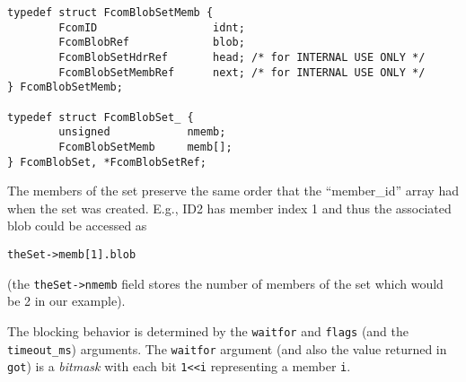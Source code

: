 \documentclass[11pt]{article}
\newcommand{\set}{set}
\newcommand{\cstl}[1]{{\lstinline+#1+}}
\begin{document}
      \begin{verbatim}
typedef struct FcomBlobSetMemb {
        FcomID                  idnt;
        FcomBlobRef             blob;
        FcomBlobSetHdrRef       head; /* for INTERNAL USE ONLY */
        FcomBlobSetMembRef      next; /* for INTERNAL USE ONLY */
} FcomBlobSetMemb;
 
typedef struct FcomBlobSet_ {
        unsigned            nmemb;
        FcomBlobSetMemb     memb[];
} FcomBlobSet, *FcomBlobSetRef;
      \end{verbatim}

      The members of the \set{} preserve the same order that the ``member\_id'' array
      had when the \set{} was created. E.g., ID2 has member index 1 and thus the
      associated blob could be accessed as
      \begin{verbatim}
theSet->memb[1].blob
      \end{verbatim}
      (the \cstl{theSet->nmemb} field stores the number of members of the set which would
      be 2 in our example).

      The blocking behavior is determined by the \cstl{waitfor} and \cstl{flags} 
      (and the \cstl{timeout_ms}) arguments. The \cstl{waitfor} argument (and also the value
      returned in \cstl{got}) is a {\em bitmask} with each bit \cstl{1<<i} 
      representing a member \cstl{i}.
     
\end{document}
